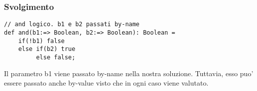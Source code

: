 \subsubsection*{Svolgimento}

\begin{lstlisting}
// and logico. b1 e b2 passati by-name 
def and(b1:=> Boolean, b2:=> Boolean): Boolean =
	if(!b1) false
	else if(b2) true
		 else false; 
\end{lstlisting}

Il parametro b1 viene passato by-name nella nostra soluzione. Tuttavia, esso puo' essere passato anche by-value visto che in ogni caso viene valutato. 










